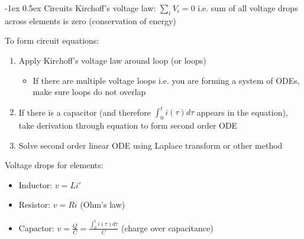 \documentclass[10pt,landscape]{article}
\makeatletter
\renewcommand{\section}{\@startsection{section}{1}{0mm}%
                                {-1ex}%
                                {0.5ex}%
                                {\normalfont\large\bfseries}}
\makeatother
\begin{document}
\begin{multicols}{3}
\section{Circuits}
Kirchoff's voltage law: $\sum_i V_i = 0$ i.e. sum of all voltage drops across elements is zero (conservation of energy)
\par To form circuit equations:
\begin{enumerate}
\item Apply Kirchoff's voltage law around loop (or loops)
\begin{itemize}
\item If there are multiple voltage loops i.e. you are forming a system of ODEs, make sure loops do not overlap
\end{itemize}
\item If there is a capacitor (and therefore $\int_0^t i(\tau)d\tau$ appears in the equation), take derivation through equation to form second order ODE
\item Solve second order linear ODE using Laplace transform or other method
\end{enumerate}

Voltage drops for elements:
\begin{itemize}
\item Inductor: $v = Li'$
\item Resistor: $v = Ri$ (Ohm's law)
\item Capactor: $v = \frac{Q}{C} = \frac{\int_0^t i(\tau)d\tau}{C}$ (charge over capacitance)
\end{itemize}




\end{multicols}
\end{document}
